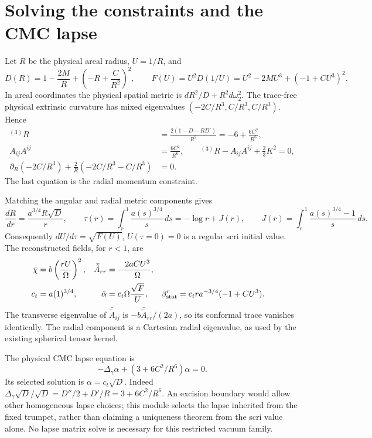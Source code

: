 \documentclass[11pt]{article}
\newcommand{\Om}{\Omega}
\newcommand{\bc}{\bar\chi}
\newcommand{\ba}{\bar\alpha}
\newcommand{\Ac}{\bar{\tilde A}}
\begin{document}
\section{Solving the constraints and the CMC lapse}
Let $R$ be the physical areal radius, $U=1/R$, and
\begin{equation}
 D(R)=1-\frac{2M}{R}+\left(-R+\frac{C}{R^2}\right)^2,
 \qquad F(U)=U^2D(1/U)=U^2-2MU^3+(-1+CU^3)^2.
\end{equation}
In areal coordinates the physical spatial metric is
$dR^2/D+R^2d\omega_2^2$. The trace-free physical extrinsic curvature has mixed
eigenvalues $(-2C/R^3,C/R^3,C/R^3)$. Hence
\begin{align}
 {}^{(3)}R&=\frac{2(1-D-RD')}{R^2}=-6+\frac{6C^2}{R^6},\\
 A_{ij}A^{ij}&=\frac{6C^2}{R^6},\qquad
 {}^{(3)}R-A_{ij}A^{ij}+\tfrac23K^2=0,\\
 \partial_R(-2C/R^3)+\frac2R(-2C/R^3-C/R^3)&=0.
\end{align}
The last equation is the radial momentum constraint.

Matching the angular and radial metric components gives
\begin{equation}
 \frac{dR}{dr}=\frac{a^{3/4}R\sqrt D}{r},\qquad
 \tau(r)=\int_r^1\frac{a(s)^{3/4}}s\,ds=-\log r+J(r),\qquad
 J(r)=\int_r^1\frac{a(s)^{3/4}-1}s\,ds.
\end{equation}
Consequently $dU/d\tau=\sqrt{F(U)}$, $U(\tau=0)=0$ is a regular scri initial
value. The reconstructed fields, for $r<1$, are
\begin{align}
 \bc&=b\left(\frac{rU}{\Om}\right)^2,&
 \Ac_{rr}&=-\frac{2aCU^3}{\Om},\label{eq:project}\\
 c_t&=a(1)^{3/4},&
 \ba&=c_t\Om\frac{\sqrt F}{U},&
 \beta_{\rm stat}^r&=c_t r a^{-3/4}(-1+CU^3).\label{eq:static}
\end{align}
The transverse eigenvalue of $\Ac_{ij}$ is $-b\Ac_{rr}/(2a)$, so its conformal
trace vanishes identically. The radial component is a Cartesian radial
eigenvalue, as used by the existing spherical tensor kernel.

The physical CMC lapse equation is
\begin{equation}
 -\Delta_\gamma\alpha+(3+6C^2/R^6)\alpha=0.
 \label{eq:lapse}
\end{equation}
Its selected solution is $\alpha=c_t\sqrt D$. Indeed
$\Delta_\gamma\sqrt D/\sqrt D=D''/2+D'/R=3+6C^2/R^6$.
An excision boundary would allow other homogeneous lapse choices; this module
selects the lapse inherited from the fixed trumpet, rather than claiming a
uniqueness theorem from the scri value alone. No lapse matrix solve is necessary
for this restricted vacuum family.
\end{document}

